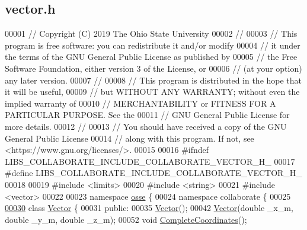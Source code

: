 \hypertarget{vector_8h_source}{}\subsection{vector.\+h}
\label{vector_8h_source}

\begin{DoxyCode}
00001 \textcolor{comment}{// Copyright (C) 2019 The Ohio State University}
00002 \textcolor{comment}{//}
00003 \textcolor{comment}{// This program is free software: you can redistribute it and/or modify}
00004 \textcolor{comment}{// it under the terms of the GNU General Public License as published by}
00005 \textcolor{comment}{// the Free Software Foundation, either version 3 of the License, or}
00006 \textcolor{comment}{// (at your option) any later version.}
00007 \textcolor{comment}{//}
00008 \textcolor{comment}{// This program is distributed in the hope that it will be useful,}
00009 \textcolor{comment}{// but WITHOUT ANY WARRANTY; without even the implied warranty of}
00010 \textcolor{comment}{// MERCHANTABILITY or FITNESS FOR A PARTICULAR PURPOSE.  See the}
00011 \textcolor{comment}{// GNU General Public License for more details.}
00012 \textcolor{comment}{//}
00013 \textcolor{comment}{// You should have received a copy of the GNU General Public License}
00014 \textcolor{comment}{// along with this program.  If not, see <https://www.gnu.org/licenses/>.}
00015 
00016 \textcolor{preprocessor}{#ifndef LIBS\_COLLABORATE\_INCLUDE\_COLLABORATE\_VECTOR\_H\_}
00017 \textcolor{preprocessor}{#define LIBS\_COLLABORATE\_INCLUDE\_COLLABORATE\_VECTOR\_H\_}
00018 
00019 \textcolor{preprocessor}{#include <limits>}
00020 \textcolor{preprocessor}{#include <string>}
00021 \textcolor{preprocessor}{#include <vector>}
00022 
00023 \textcolor{keyword}{namespace }\hyperlink{namespaceosse}{osse} \{
00024 \textcolor{keyword}{namespace }collaborate \{
00025 
\hyperlink{classosse_1_1collaborate_1_1_vector}{00030} \textcolor{keyword}{class }\hyperlink{classosse_1_1collaborate_1_1_vector}{Vector} \{
00031  \textcolor{keyword}{public}:
00035   \hyperlink{classosse_1_1collaborate_1_1_vector_af495b2efd099a897642ec06be87abc16}{Vector}();
00042   \hyperlink{classosse_1_1collaborate_1_1_vector_af495b2efd099a897642ec06be87abc16}{Vector}(\textcolor{keywordtype}{double} \_x\_m, \textcolor{keywordtype}{double} \_y\_m, \textcolor{keywordtype}{double} \_z\_m);
00052   \textcolor{keywordtype}{void} \hyperlink{classosse_1_1collaborate_1_1_vector_a427667ec4887828003c2d3652462ad94}{CompleteCoordinates}();

\end{DoxyCode}
